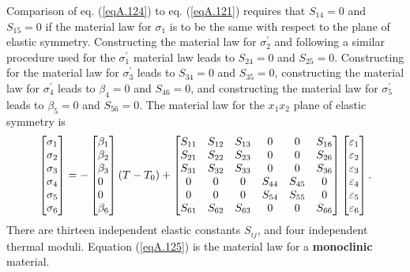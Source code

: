 \documentclass{AeroStructure-ERJohnson}
\begin{document}
Comparison of eq. (\ref{eqA.124}) to eq. (\ref{eqA.121}) requires that $S_{14}=0$ and $S_{15}=0$ if the material law for $\sigma_{1}$ is to be the same with respect to the plane of elastic symmetry. Constructing the material law for $\sigma_{2}^{\prime}$ and following a similar procedure used for the $\sigma_{1}^{\prime}$ material law leads to $S_{24}=0$ and $S_{25}=0$. Constructing for the material law for $\sigma_{3}^{\prime}$ leads to $S_{34}=0$ and $S_{35}=0$, constructing the material law for $\sigma_{4}^{\prime}$ leads to $\beta_{4}=0$ and $S_{46}=0$, and constructing the material law for $\sigma_{5}^{\prime}$ leads to $\beta_{5}=0$ and $S_{56}=0$. The material law for the $x_{1} x_{2}$ plane of elastic symmetry is
\begin{align}\label{eqA.125}
\left[\begin{array}{@{}l@{}}\sigma_{1} \\\sigma_{2} \\\sigma_{3} \\\sigma_{4} \\\sigma_{5} \\\sigma_{6}\end{array}\right]=-\left[\begin{array}{@{}l@{}}\beta_{1} \\\beta_{2} \\\beta_{3} \\0 \\0 \\\beta_{6}\end{array}\right](T-T_{0})+\left[\begin{array}{@{}cccccc@{}}S_{11} & S_{12} & S_{13} & 0 & 0 & S_{16} \\S_{21} & S_{22} & S_{23} & 0 & 0 & S_{26} \\S_{31} & S_{32} & S_{33} & 0 & 0 & S_{36} \\0 & 0 & 0 & S_{44} & S_{45} & 0 \\0 & 0 & 0 & S_{54} & S_{55} & 0 \\S_{61} & S_{62} & S_{63} & 0 & 0 & S_{66}\end{array}\right]\left[\begin{array}{@{}l@{}}\varepsilon_{1} \\\varepsilon_{2} \\\varepsilon_{3} \\\varepsilon_{4} \\\varepsilon_{5} \\\varepsilon_{6}\end{array}\right].
\end{align}
There are thirteen independent elastic constants $S_{i j}$, and four independent thermal moduli. Equation (\ref{eqA.125}) is the material law for a \textbf{monoclinic} material.
\end{document}
